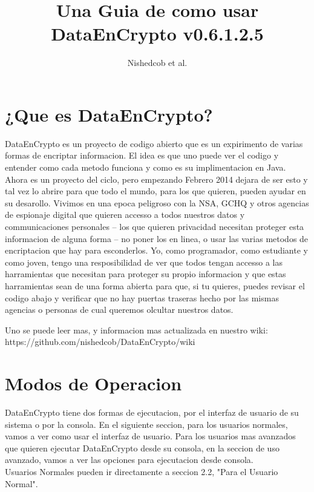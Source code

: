 \documentclass{article}
\author{Nishedcob et al.}
\title{Una Guia de como usar DataEnCrypto v0.6.1.2.5}
\begin{document}
	\maketitle
	\tableofcontents
	\section{¿Que es DataEnCrypto?}
		DataEnCrypto es un proyecto de codigo abierto que es un expirimento de varias formas de encriptar informacion. El idea es que uno puede ver el codigo y entender como cada metodo funciona y como es su implimentacion en Java. Ahora es un proyecto del ciclo, pero empezando Febrero 2014 dejara de ser esto y tal vez lo abrire para que todo el mundo, para los que quieren, pueden ayudar en su desarollo. Vivimos en una epoca peligroso con la NSA, GCHQ y otros agencias de espionaje digital que quieren accesso a todos nuestros datos y communicaciones personales -- los que quieren privacidad necesitan proteger esta informacion de alguna forma -- no poner los en linea, o usar las varias metodos de encriptacion que hay para esconderlos. Yo, como programador, como estudiante y como joven, tengo una resposibilidad de ver que todos tengan accesso a las harramientas que necesitan para proteger su propio informacion y que estas harramientas sean de una forma abierta para que, si tu quieres, puedes revisar el codigo abajo y verificar que no hay puertas traseras hecho por las mismas agencias o personas de cual queremos olcultar nuestros datos.

		Uno se puede leer mas, y informacion mas actualizada en nuestro wiki: https://github.com/nishedcob/DataEnCrypto/wiki
	\section{Modos de Operacion}
		DataEnCrypto tiene dos formas de ejecutacion, por el interfaz de usuario de su sistema o por la consola. En el siguiente seccion, para los usuarios normales, vamos a ver como usar el interfaz de usuario. Para los usuarios mas avanzados que quieren ejecutar DataEnCrypto desde su consola, en la seccion de uso avanzado, vamos a ver las opciones para ejecutacion desde consola. \\
		Usuarios Normales pueden ir directamente a seccion 2.2, "Para el Usuario Normal".
\end{document}
